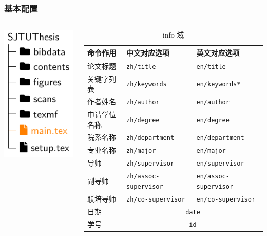 \begin{frame}[label=setup]
  \frametitle{基本配置}
  \begin{columns}
    \begin{column}{0.35\textwidth}
      \includegraphics[page=4]{support/figures/thesisdir.pdf}
    \end{column}
    \begin{column}{0.65\textwidth}
      \begin{table}
        \centering
        \caption{info 域}
        \footnotesize
        \begin{tabular}{lll} \toprule
          命令作用     & 中文对应选项                      & 英文对应选项                 \\ \midrule
          论文标题     & \texttt{zh/title}                 & \texttt{en/title}            \\
          关键字列表   & \texttt{zh/keywords}              & \texttt{en/keywords*}        \\
          作者姓名     & \texttt{zh/author}                & \texttt{en/author}           \\
          申请学位名称 & \texttt{zh/degree}                & \texttt{en/degree}           \\
          院系名称     & \texttt{zh/department}            & \texttt{en/department}       \\
          专业名称     & \texttt{zh/major}                 & \texttt{en/major}            \\
          导师         & \texttt{zh/supervisor}            & \texttt{en/supervisor}       \\
          副导师       & \texttt{zh/assoc-supervisor}      & \texttt{en/assoc-supervisor} \\
          联培导师     & \texttt{zh/co-supervisor}         & \texttt{en/co-supervisor}    \\
          日期         & \multicolumn{2}{c}{\texttt{date}}                                \\
          学号         & \multicolumn{2}{c}{\texttt{id}}                                  \\ \bottomrule
        \end{tabular}
      \end{table}
    \end{column}
  \end{columns}
\end{frame}

